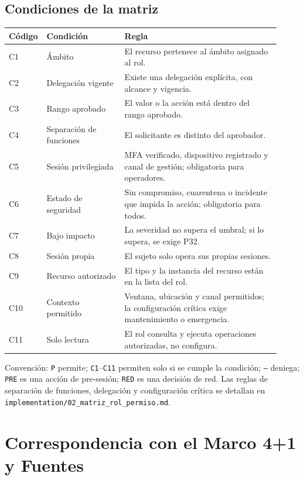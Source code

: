 \documentclass[11pt,a4paper]{report}
\begin{document}
\section{Condiciones de la matriz}
\begin{longtable}{p{0.08\linewidth}p{0.28\linewidth}p{0.56\linewidth}}
\toprule
Código & Condición & Regla\\
\midrule
C1 & Ámbito & El recurso pertenece al ámbito asignado al rol.\\
C2 & Delegación vigente & Existe una delegación explícita, con alcance y vigencia.\\
C3 & Rango aprobado & El valor o la acción está dentro del rango aprobado.\\
C4 & Separación de funciones & El solicitante es distinto del aprobador.\\
C5 & Sesión privilegiada & MFA verificado, dispositivo registrado y canal de gestión; obligatoria para operadores.\\
C6 & Estado de seguridad & Sin compromiso, cuarentena o incidente que impida la acción; obligatoria para todos.\\
C7 & Bajo impacto & La severidad no supera el umbral; si lo supera, se exige P32.\\
C8 & Sesión propia & El sujeto solo opera sus propias sesiones.\\
C9 & Recurso autorizado & El tipo y la instancia del recurso están en la lista del rol.\\
C10 & Contexto permitido & Ventana, ubicación y canal permitidos; la configuración crítica exige mantenimiento o emergencia.\\
C11 & Solo lectura & El rol consulta y ejecuta operaciones autorizadas, no configura.\\
\bottomrule
\end{longtable}

Convención: \texttt{P} permite; \texttt{C1}--\texttt{C11} permiten solo si se cumple la condición; \texttt{---} deniega; \texttt{PRE} es una acción de pre-sesión; \texttt{RED} es una decisión de red. Las reglas de separación de funciones, delegación y configuración crítica se detallan en \texttt{implementation/02\_matriz\_rol\_permiso.md}.


\chapter{Correspondencia con el Marco 4+1 y Fuentes}
\end{document}

